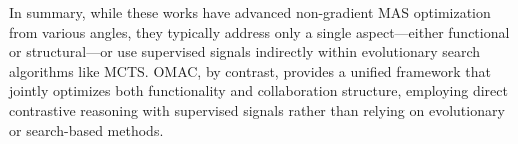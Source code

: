 In summary, while these works have advanced non-gradient MAS optimization from various angles, they typically address only a single aspect—either functional or structural—or use supervised signals indirectly within evolutionary search algorithms like MCTS. OMAC, by contrast, provides a unified framework that jointly optimizes both functionality and collaboration structure, employing direct contrastive reasoning with supervised signals rather than relying on evolutionary or search-based methods.